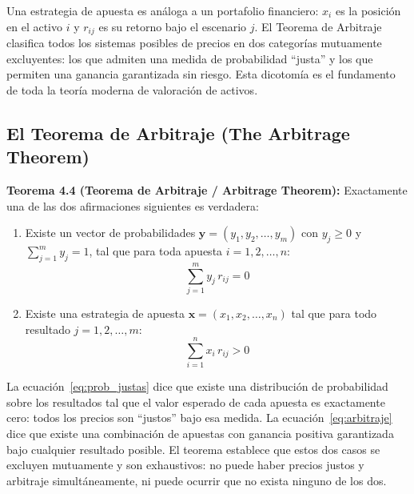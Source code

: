 \documentclass[12pt]{article}
\begin{document}
\begin{intuicion}
Una estrategia de apuesta es an\'aloga a un portafolio financiero: $x_i$
es la posici\'on en el activo $i$ y $r_{ij}$ es su retorno bajo el escenario $j$.
El Teorema de Arbitraje clasifica todos los sistemas posibles de precios en
dos categor\'ias mutuamente excluyentes: los que admiten una medida de
probabilidad ``justa'' y los que permiten una ganancia garantizada sin riesgo.
Esta dicotom\'ia es el fundamento de toda la teor\'ia moderna de valoraci\'on
de activos.
\end{intuicion}

\subsection{El Teorema de Arbitraje (The Arbitrage Theorem)}

\textbf{Teorema 4.4 (Teorema de Arbitraje / Arbitrage Theorem):} Exactamente
una de las dos afirmaciones siguientes es verdadera:

\begin{enumerate}
  \item Existe un vector de probabilidades $\mathbf{y} = (y_1, y_2, \ldots, y_m)$
        con $y_j \geq 0$ y $\sum_{j=1}^{m} y_j = 1$, tal que para toda apuesta
        $i = 1, 2, \ldots, n$:
        \begin{equation}
          \sum_{j=1}^{m} y_j \, r_{ij} = 0
          \label{eq:prob_justas}
        \end{equation}

  \item Existe una estrategia de apuesta $\mathbf{x} = (x_1, x_2, \ldots, x_n)$
        tal que para todo resultado $j = 1, 2, \ldots, m$:
        \begin{equation}
          \sum_{i=1}^{n} x_i \, r_{ij} > 0
          \label{eq:arbitraje}
        \end{equation}
\end{enumerate}

\begin{intuicionmat}
La ecuaci\'on~\eqref{eq:prob_justas} dice que existe una distribuci\'on de
probabilidad sobre los resultados tal que el valor esperado de cada apuesta
es exactamente cero: todos los precios son ``justos'' bajo esa medida. La
ecuaci\'on~\eqref{eq:arbitraje} dice que existe una combinaci\'on de apuestas
con ganancia positiva garantizada bajo cualquier resultado posible. El teorema
establece que estos dos casos se excluyen mutuamente y son exhaustivos: no
puede haber precios justos y arbitraje simult\'aneamente, ni puede ocurrir
que no exista ninguno de los dos.
\end{intuicionmat}
\end{document}
